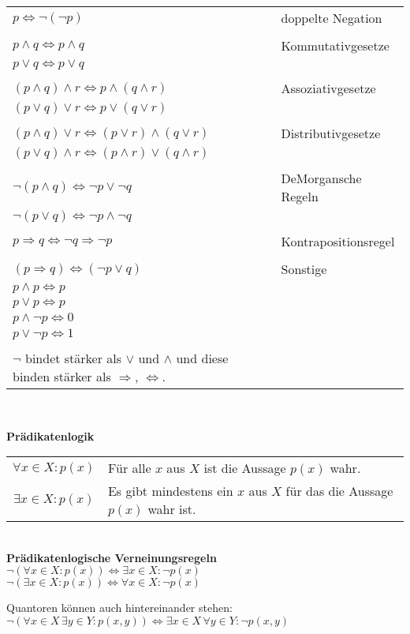 \documentclass[a4paper]{article}
\begin{document}
\begin{tabular}{l l}
$  p \Leftrightarrow \lnot (\lnot p) $   &   doppelte Negation \\
\\
$p \land q \Leftrightarrow p \land q$ &  Kommutativgesetze\\
$p \lor q  \Leftrightarrow p \lor q$ \\
\\
$(p \land q) \land r \Leftrightarrow p \land (q \land r)$ & Assoziativgesetze \\
$(p \lor q) \lor r \Leftrightarrow p \lor (q \lor r)$ \\
\\
$(p \land q) \lor r\Leftrightarrow (p \lor r) \land (q \lor r)$  & Distributivgesetze \\
$(p \lor q) \land r \Leftrightarrow (p \land r) \lor (q \land r)$ \\
\\
$\lnot(p \land q) \Leftrightarrow \lnot p \lor \lnot q$ & DeMorgansche Regeln \\
$\lnot(p \lor q) \Leftrightarrow \lnot p \land \lnot q$  \\
\\
$p \Rightarrow q \Leftrightarrow \lnot q \Rightarrow \lnot p$ & Kontrapositionsregel \\
\\
$(p \Rightarrow q) \Leftrightarrow (\lnot p \lor q)$ & Sonstige \\
$p \land p  \Leftrightarrow p $ \\
$p \lor p  \Leftrightarrow p $  \\
$p \land \lnot p  \Leftrightarrow 0 $ \\
$p \lor \lnot p  \Leftrightarrow 1 $ \\
\\
$\lnot$ bindet stärker als $\lor$ und $\land$ und diese binden stärker als $\Rightarrow$, $\Leftrightarrow$. 
\end{tabular} \\
\bigskip

\textbf{Prädikatenlogik}
\bigskip

\begin{tabular}{c l}

$\forall x \in X: p(x)$ & Für alle $x$ aus $X$ ist die Aussage $p(x)$ wahr. \\
$\exists x \in X: p(x)$ & Es gibt mindestens ein $x$ aus $X$ für das die Aussage $p(x)$ wahr ist.\\
\end{tabular} \\

\bigskip
\textbf{Prädikatenlogische Verneinungsregeln} \\

$\lnot (\forall x \in X: p(x)) \Leftrightarrow \exists x \in X : \lnot p(x)$   \\
$\lnot (\exists x \in X : p(x)) \Leftrightarrow \forall x \in X: \lnot p(x)$  
\bigskip

Quantoren können auch hintereinander stehen: \\
$\lnot (\forall x \in X \, \exists y \in Y: p(x,y)) \Leftrightarrow \exists x \in X \, \forall y \in Y: \lnot p(x,y)$
\end{document}
